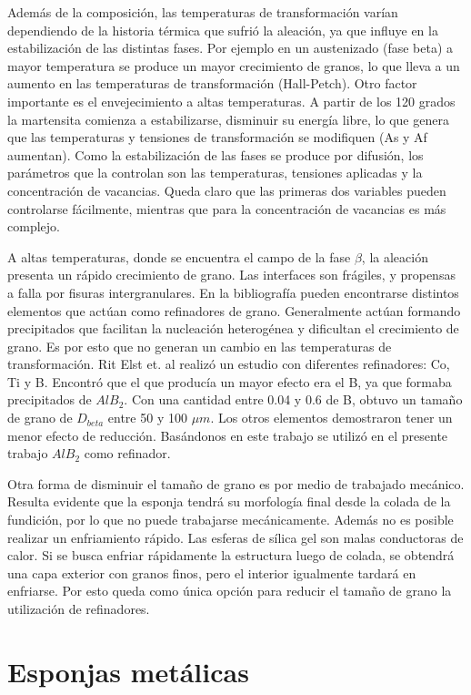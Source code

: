\documentclass[a4paper,12pt,fleqn,twoside,openany]{book}
\begin{document}
Además de la composición, las temperaturas de transformación varían dependiendo de la historia térmica que sufrió la aleación, ya que influye en la estabilización 
de las distintas fases. Por ejemplo en un austenizado (fase beta) a mayor temperatura se produce un mayor crecimiento de granos, lo que lleva a un aumento en las 
temperaturas de transformación (Hall-Petch). Otro factor importante es el envejecimiento a altas temperaturas. A partir de los 120 grados la martensita comienza 
a estabilizarse, disminuir su energía libre, lo que genera que las temperaturas y tensiones de transformación se modifiquen (As y Af aumentan). Como la estabilización 
de las fases se produce por difusión, los parámetros que la controlan son las temperaturas, tensiones aplicadas y la concentración de vacancias. Queda claro que las 
primeras dos variables pueden controlarse fácilmente, mientras que para la concentración de vacancias es más complejo.

A altas temperaturas, donde se encuentra el campo de la fase $\beta$, la aleación presenta un rápido crecimiento de grano. Las interfaces son frágiles, y propensas 
a falla por fisuras intergranulares. En la bibliografía pueden encontrarse distintos elementos que actúan como refinadores de grano. Generalmente actúan formando 
precipitados que facilitan la nucleación heterogénea y dificultan el crecimiento de grano. Es por esto que no generan un cambio en las temperaturas de 
transformación. Rit Elst et. al \cite{ritelst} realizó un estudio con diferentes refinadores: Co, Ti y B. Encontró que el que producía un mayor efecto era el B, 
ya que formaba precipitados de $AlB_{2}$. Con una cantidad entre 0.04 y 0.6 de B, obtuvo un tamaño de grano de $D_{beta}$ entre 50 y 100 $\mu m$. Los otros elementos 
demostraron tener un menor efecto de reducción. Basándonos en este trabajo se utilizó en el presente trabajo $AlB_{2}$ como refinador.

Otra forma de disminuir el tamaño de grano es por medio de trabajado mecánico. Resulta evidente que la esponja tendrá su morfología final desde la colada de la 
fundición, por lo que no puede trabajarse mecánicamente. Además no es posible realizar un enfriamiento rápido. Las esferas de sílica gel son malas conductoras de 
calor. Si se busca enfriar rápidamente la estructura luego de colada, se obtendrá una capa exterior con granos finos, pero el interior igualmente tardará en 
enfriarse. Por esto queda como única opción para reducir el tamaño de grano la utilización de refinadores.


\section{Esponjas metálicas}
\end{document}
